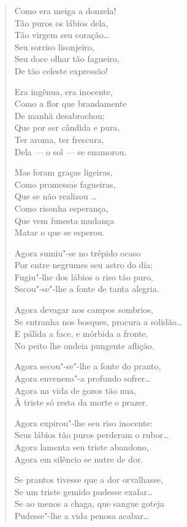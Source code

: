 \begin{verse}
Como era meiga a donzela!\\
Tão puros os lábios dela,\\
Tão virgem seu coração\ldots{}\\
Seu sorriso lisonjeiro,\\
Seu doce olhar tão fagueiro,\\
De tão celeste expressão!

Era ingênua, era inocente,\\
Como a flor que brandamente\\
De manhã desabrochou;\\
Que por ser cândida e pura,\\
Ter aroma, ter frescura,\\
Dela --- o sol --- se enamorou.

Mas foram graças ligeiras,\\
Como promessas fagueiras,\\
Que se não realizou \ldots{}\\
Como risonha esperança,\\
Que vem funesta mudança\\
Matar o que se esperou.

Agora sumiu"-se no trépido ocaso\\
Por entre negrumes seu astro do dia;\\
Fugiu"-lhe dos lábios o riso tão puro,\\
Secou"-se"-lhe a fonte de tanta alegria.

Agora devagar nos campos sombrios,\\
Se entranha nos bosques, procura a solidão\ldots{}\\
E pálida a face, e mórbida a fronte,\\
No peito lhe ondeia pungente aflição.

Agora secou"-se"-lhe a fonte do pranto,\\
Agora envenena"-a profundo sofrer\ldots{}\\
Agora na vida de gozos tão nua,\\
À triste só resta da morte o prazer.

Agora expirou"-lhe seu riso inocente:\\
Seus lábios tão puros perderam o rubor\ldots{}\\
Agora lamenta seu triste abandono,\\
Agora em silêncio se nutre de dor.

Se prantos tivesse que a dor orvalhasse,\\
Se um triste gemido pudesse exalar\ldots{}\\
Se ao menos a chaga, que sangue goteja\\
Pudesse"-lhe a vida penosa acabar\ldots{}


\end{verse}
